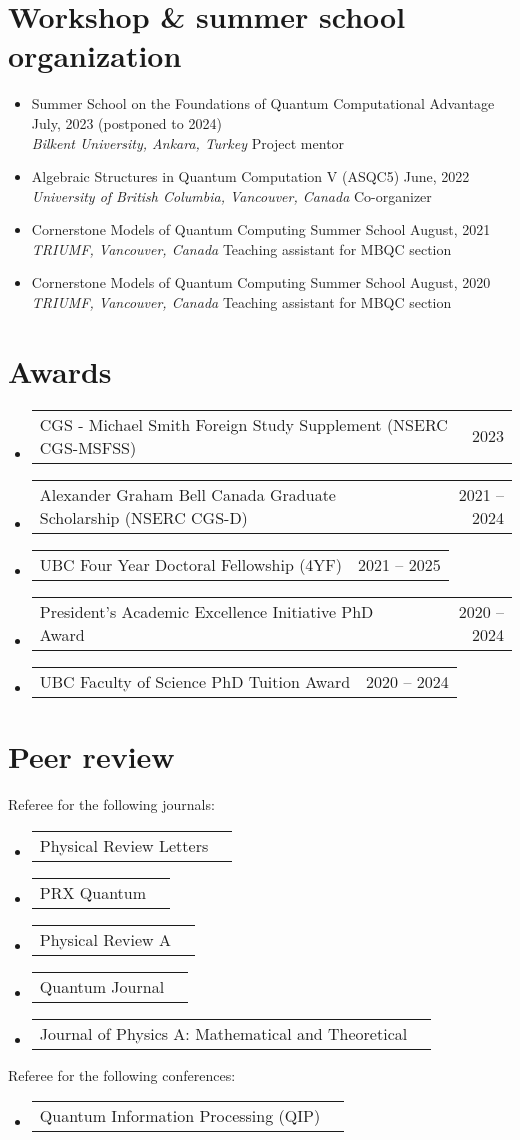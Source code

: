 \documentclass[letterpaper,11pt]{article}
\makeatletter
\newcommand{\OrganizerItem}[4]{
	\item{\parbox{0.97\textwidth}{
			{#1} \hfill {#2}\\
			\emph{#3} \hfill {#4}
		}}
}
\newcommand{\AwardsItem}[2]{
	\item{\vspace{-1pt}
		\begin{tabular*}{0.97\textwidth}{l@{\extracolsep{\fill}}r}
			{#1} & {#2}
		\end{tabular*}
		\vspace{-5pt}
	}
}
\makeatother
\begin{document}
\section*{Workshop \& summer school organization}
\begin{itemize}[leftmargin=*]
	\OrganizerItem{Summer School on the Foundations of Quantum Computational Advantage}{July, 2023 (postponed to 2024)}{Bilkent University, Ankara, Turkey}{Project mentor}
	\OrganizerItem{Algebraic Structures in Quantum Computation V (ASQC5)}{June, 2022}{University of British Columbia, Vancouver, Canada}{Co-organizer}
	\OrganizerItem{Cornerstone Models of Quantum Computing Summer School}{August, 2021}{TRIUMF, Vancouver, Canada}{Teaching assistant for MBQC section}
	\OrganizerItem{Cornerstone Models of Quantum Computing Summer School}{August, 2020}{TRIUMF, Vancouver, Canada}{Teaching assistant for MBQC section}
\end{itemize}

\section*{Awards}
\begin{itemize}[leftmargin=*]
	\AwardsItem{CGS - Michael Smith Foreign Study Supplement (NSERC CGS-MSFSS)}{2023}
	\AwardsItem{Alexander Graham Bell Canada Graduate Scholarship (NSERC CGS-D)}{2021 -- 2024}
	\AwardsItem{UBC Four Year Doctoral Fellowship (4YF)}{2021 -- 2025}
	\AwardsItem{President's Academic Excellence Initiative PhD Award}{2020 -- 2024}
	\AwardsItem{UBC Faculty of Science PhD Tuition Award }{2020 -- 2024}
\end{itemize}

\section*{Peer review}
Referee for the following journals:\vspace{-2mm}
\begin{itemize}[leftmargin=*]
	\AwardsItem{Physical Review Letters}{}
	\AwardsItem{PRX Quantum}{}
	\AwardsItem{Physical Review A}{}
	\AwardsItem{Quantum Journal}{}
	\AwardsItem{Journal of Physics A: Mathematical and Theoretical}{}
\end{itemize}
Referee for the following conferences:\vspace{-2mm}
\begin{itemize}[leftmargin=*]
	\AwardsItem{Quantum Information Processing (QIP)}{}
\end{itemize}
\end{document}
